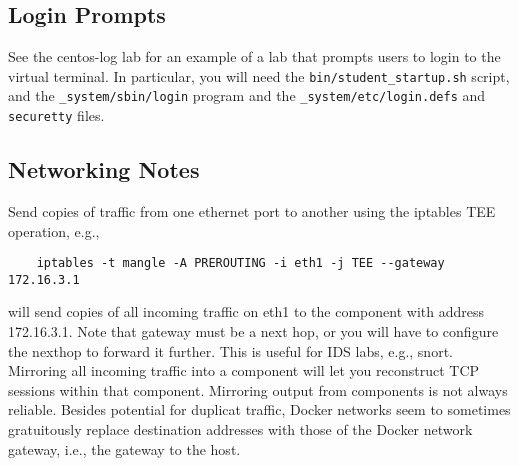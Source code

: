 \documentclass[12pt]{article}
\begin{document}
\subsection{Login Prompts}
See the centos-log lab for an example of a lab that prompts users to login to the virtual terminal.
In particular, you will need the {\tt bin/student\_startup.sh} script, and the {\tt \_system/sbin/login} program and the {\tt \_system/etc/login.defs} and {\tt securetty} files.
\subsection{Networking Notes}
Send copies of traffic from one ethernet port to another using the iptables TEE operation, e.g.,
\begin{verbatim}
    iptables -t mangle -A PREROUTING -i eth1 -j TEE --gateway 172.16.3.1
\end{verbatim}
\noindent will send copies of all incoming traffic on eth1 to the component with address 172.16.3.1.
Note that gateway must be a next hop, or you will have to configure the nexthop to forward it further.
This is useful for IDS labs, e.g., snort.  Mirroring all incoming traffic into a component will let you
reconstruct TCP sessions within that component.  Mirroring output from components is not always reliable.
Besides potential for duplicat traffic, Docker networks seem to sometimes gratuitously replace destination
addresses with those of the Docker network gateway, i.e., the gateway to the host.
\end{document}
